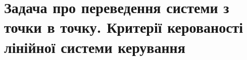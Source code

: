 




\setcounter{section}{2}
\section{Задача про переведення системи з точки в точку. Критерії керованості лінійної системи керування}








